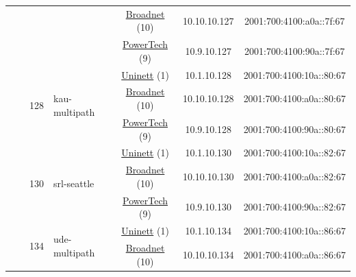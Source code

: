 \begin{small}
\begin{center}
\begin{longtable}{|c|c|c|c|c|c|c|c|}
  &  &  &  & \multicolumn{2}{|c|}{\tiny{\href{https://www.broadnet.no}{Broadnet} (10)}} & \tiny{10.10.10.127} & \tiny{2001:700:4100:a0a::7f:67} \\* \cline{5-5}\cline{6-6}\cline{7-7}\cline{8-8}
  &  &  &  & \multicolumn{2}{|c|}{\tiny{\href{http://www.powertech.no}{PowerTech} (9)}} & \tiny{10.9.10.127} & \tiny{2001:700:4100:90a::7f:67} \\* \cline{3-3}\cline{4-4}\cline{5-5}\cline{6-6}\cline{7-7}\cline{8-8}
  &  & \multirow{3}{*}{\tiny{128}} & \multicolumn{1}{|l|}{\multirow{3}{*}{\tiny{kau-multipath}}} & \multicolumn{2}{|c|}{\tiny{\href{https://www.uninett.no}{Uninett} (1)}} & \tiny{10.1.10.128} & \tiny{2001:700:4100:10a::80:67} \\* \cline{5-5}\cline{6-6}\cline{7-7}\cline{8-8}
  &  &  &  & \multicolumn{2}{|c|}{\tiny{\href{https://www.broadnet.no}{Broadnet} (10)}} & \tiny{10.10.10.128} & \tiny{2001:700:4100:a0a::80:67} \\* \cline{5-5}\cline{6-6}\cline{7-7}\cline{8-8}
  &  &  &  & \multicolumn{2}{|c|}{\tiny{\href{http://www.powertech.no}{PowerTech} (9)}} & \tiny{10.9.10.128} & \tiny{2001:700:4100:90a::80:67} \\* \cline{3-3}\cline{4-4}\cline{5-5}\cline{6-6}\cline{7-7}\cline{8-8}
  &  & \multirow{3}{*}{\tiny{130}} & \multicolumn{1}{|l|}{\multirow{3}{*}{\tiny{srl-seattle}}} & \multicolumn{2}{|c|}{\tiny{\href{https://www.uninett.no}{Uninett} (1)}} & \tiny{10.1.10.130} & \tiny{2001:700:4100:10a::82:67} \\* \cline{5-5}\cline{6-6}\cline{7-7}\cline{8-8}
  &  &  &  & \multicolumn{2}{|c|}{\tiny{\href{https://www.broadnet.no}{Broadnet} (10)}} & \tiny{10.10.10.130} & \tiny{2001:700:4100:a0a::82:67} \\* \cline{5-5}\cline{6-6}\cline{7-7}\cline{8-8}
  &  &  &  & \multicolumn{2}{|c|}{\tiny{\href{http://www.powertech.no}{PowerTech} (9)}} & \tiny{10.9.10.130} & \tiny{2001:700:4100:90a::82:67} \\* \cline{3-3}\cline{4-4}\cline{5-5}\cline{6-6}\cline{7-7}\cline{8-8}
  &  & \multirow{3}{*}{\tiny{134}} & \multicolumn{1}{|l|}{\multirow{3}{*}{\tiny{ude-multipath}}} & \multicolumn{2}{|c|}{\tiny{\href{https://www.uninett.no}{Uninett} (1)}} & \tiny{10.1.10.134} & \tiny{2001:700:4100:10a::86:67} \\* \cline{5-5}\cline{6-6}\cline{7-7}\cline{8-8}
  &  &  &  & \multicolumn{2}{|c|}{\tiny{\href{https://www.broadnet.no}{Broadnet} (10)}} & \tiny{10.10.10.134} & \tiny{2001:700:4100:a0a::86:67} \\* \cline{5-5}\cline{6-6}\cline{7-7}\cline{8-8}

\end{longtable}
\end{center}
\end{small}
